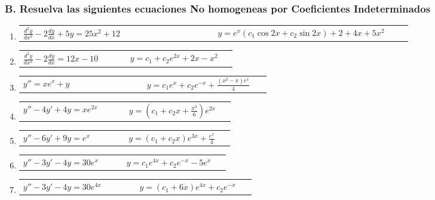 \documentclass[a4paper,12pt]{article}
\begin{document}
\subsubsection*{B. Resuelva las siguientes ecuaciones No homogeneas por Coeficientes Indeterminados}

\begin{enumerate}
    \item
    \begin{tabularx}{\linewidth}{L{0.45\linewidth} R{0.45\linewidth}}
    \( \frac{d^2 y}{dx^2} - 2 \frac{dy}{dx} + 5 y = 25 x^2 + 12 \) & \(\displaystyle y = e^x \left(c_1 \cos 2x + c_2 \sin 2x \right) + 2 + 4x + 5x^2 \)
    \end{tabularx}
    
    \item
    \begin{tabularx}{\linewidth}{L{0.45\linewidth} R{0.45\linewidth}}
    \( \frac{d^2 y}{dx^2} - 2 \frac{dy}{dx} = 12 x - 10 \) & \(\displaystyle y = c_1 + c_2 e^{2x} + 2x - x^2 \)
    \end{tabularx}

    \item
    \begin{tabularx}{\linewidth}{L{0.45\linewidth} R{0.45\linewidth}}
    \( y'' = x e^x + y \) & \(\displaystyle y = c_1 e^x + c_2 e^{-x} + \frac{(x^2 - x) e^x}{4} \)
    \end{tabularx}

    \item
    \begin{tabularx}{\linewidth}{L{0.45\linewidth} R{0.45\linewidth}}
    \( y'' - 4 y' + 4 y = x e^{2x} \) & \(\displaystyle y = (c_1 + c_2 x + \frac{x^3}{6}) e^{2x} \)
    \end{tabularx}

    \item
    \begin{tabularx}{\linewidth}{L{0.45\linewidth} R{0.45\linewidth}}
    \( y'' - 6 y' + 9 y = e^x \) & \(\displaystyle y = (c_1 + c_2 x) e^{3x} + \frac{e^x}{4} \)
    \end{tabularx}

    \item
    \begin{tabularx}{\linewidth}{L{0.45\linewidth} R{0.45\linewidth}}
    \( y'' - 3 y' - 4 y = 30 e^x \) & \(\displaystyle y = c_1 e^{4x} + c_2 e^{-x} - 5 e^x \)
    \end{tabularx}

    \item
    \begin{tabularx}{\linewidth}{L{0.45\linewidth} R{0.45\linewidth}}
    \( y'' - 3 y' - 4 y = 30 e^{4x} \) & \(\displaystyle y = (c_1 + 6 x) e^{4x} + c_2 e^{-x} \)
    \end{tabularx}


\end{enumerate}
\end{document}
